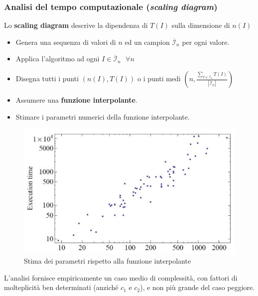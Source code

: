 \documentclass{article}
\begin{document}
\subsubsection{Analisi del tempo computazionale (\textit{scaling diagram})}
Lo \textbf{scaling diagram} descrive la dipendenza di $T(I)$ sulla dimensione di $n(I)$
\begin{itemize}
    \item Genera una sequenza di valori di $n$ ed un campion $\overline{\mathcal{I}}_n$
          per ogni valore.
    \item Applica l'algoritmo ad ogni $I\in\overline{\mathcal{I}}_n\text{  }\forall n$
    \item Disegna tutti i punti $(n(I),T(I))$ o i punti medi $\left(n,\frac{\sum_{I\in\overline{\mathcal{I}}_n}T(I)}{|\overline{\mathcal{I}}_n|}\right)$
    \item Assumere una \textbf{funzione interpolante}.
    \item Stimare i parametri numerici della funzione interpolante.
\end{itemize}
\begin{figure}[H]
    \centering
    \includegraphics[scale=0.4]{images/interp_funct.png}
    \caption{Stima dei parametri rispetto alla funzione interpolante}
\end{figure}
L'analisi fornisce empiricamente un caso medio di complessità, con fattori di molteplicità
ben determinati (anziché $c_1$ e $c_2$), e non più grande del caso peggiore.
\end{document}
